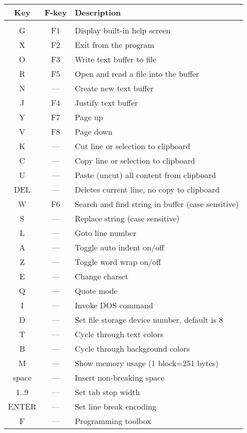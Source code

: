 \documentclass{article}
\begin{document}
    \begin{longtable}[l]{c c l}
        \textbf{Key} & \textbf{F-key} & \textbf{Description} \\
        \hline \\
        G    & F1    & Display built-in help screen \\
        X    & F2    & Exit from the program \\
        O    & F3    & Write text buffer to file \\
        R    & F5    & Open and read a file into the buffer \\
        N    & ---   & Create new text buffer \\
        J    & F4    & Justify text buffer \\
        Y    & F7    & Page up \\
        V    & F8    & Page down \\
        K    & ---   & Cut line or selection to clipboard \\
        C    & ---   & Copy line or selection to clipboard \\
        U    & ---   & Paste (uncut) all content from clipboard \\
        DEL  & ---   & Deletes current line, no copy to clipboard \\
        W    & F6    & Search and find string in buffer (case sensitive) \\
        S    & ---   & Replace string (case sensitive) \\
        L    & ---   & Goto line number \\
        A    & ---   & Toggle auto indent on/off \\
        Z    & ---   & Toggle word wrap on/off \\
        E    & ---   & Change charset \\
        Q    & ---   & Quote mode \\
        I    & ---   & Invoke DOS command \\
        D    & ---   & Set file storage device number, default is 8 \\
        T    &  ---  & Cycle through text colors \\
        B    &  ---  & Cycle through background colors \\
        M    &  ---  & Show memory usage (1 block=251 bytes) \\
        space& ---   & Insert non-breaking space \\
        1..9 & ---   & Set tab stop width \\
        ENTER & ---  & Set line break encoding \\
        F    & ---   & Programming toolbox \\
    \end{longtable}
\end{document}
